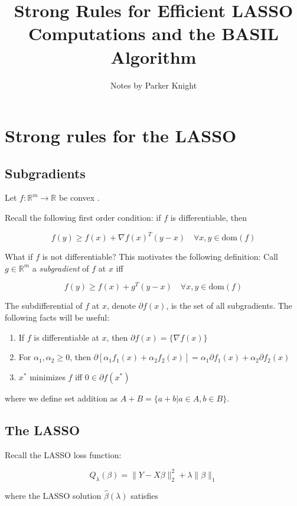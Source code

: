 \documentclass{amsart}
\title{Strong Rules for Efficient LASSO Computations and the BASIL Algorithm}
\author{Notes by Parker Knight}
\newcommand{\R}{\mathbb{R}}
\newcommand{\dom}{\textrm{dom}}
\begin{document}
\maketitle

\section{Strong rules for the LASSO}

\subsection{Subgradients}

Let $f: \R^m \rightarrow \R$ be convex \cite{boyd_convex_2004}.

\bigskip

Recall the following first order condition: if $f$ is differentiable, then 

$$f(y) \geq f(x) + \nabla f(x)^T(y - x) \quad \forall x, y \in \dom(f)$$

What if $f$ is not differentiable? This motivates the following definition: Call
$g \in \R^m$ a \textit{subgradient} of $f$ at $x$ iff

$$f(y) \geq f(x) + g^T(y - x) \quad \forall x, y \in \dom(f)$$

The subdifferential of $f$ at $x$, denote $\partial f(x)$, is the set of all
subgradients. The following facts will be useful:

\begin{enumerate}
	\item If $f$ is differentiable at $x$, then $\partial f(x) = \{\nabla f(x) \}$
	\item For $\alpha_1, \alpha_2 \geq 0$, then $\partial \left[
	\alpha_1 f_1(x) + \alpha_2 f_2(x) \right] = \alpha_1 \partial f_1(x) +
	\alpha_2 \partial f_2(x)$
	\item $x^*$ minimizes $f$ iff $0 \in \partial f(x^*)$
\end{enumerate}

where we define set addition as $A + B = \{a + b | a \in A, b \in B \}$. 
\subsection{The LASSO}

Recall the LASSO \cite{tibshirani_strong_2012} loss function:

$$Q_{\lambda}(\beta) = \|Y - X\beta \|_2^2 + \lambda \|\beta \|_1$$

where the LASSO solution $\hat{\beta}(\lambda)$ satisfies
\end{document}
